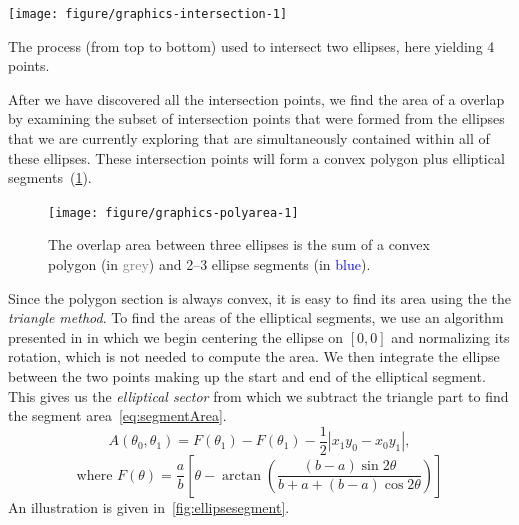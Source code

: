 \documentclass[
  a4paper,
  nofonts,
  nobib,
  titlepage,
  justified,
  marginals=raggedouter,
  nohyper
]{tufte-handout}\usepackage[]{graphicx}\usepackage[]{color}
\newenvironment{knitrout}{}{} %
\begin{document}
\begin{marginfigure}%
\begin{knitrout}
\color{fgcolor}

{\centering \texttt{[image: figure/graphics-intersection-1]} 

}



\end{knitrout}
\caption{The process (from top to bottom) used to intersect two ellipses, here yielding 4 points.}
\label{fig:intersection}
\end{marginfigure}

After we have discovered all the intersection points,
we find the area of a overlap by examining the subset of
intersection points that were formed from the ellipses that we are currently
exploring that are simultaneously contained within all of these ellipses. These
intersection points will form a convex polygon plus elliptical
segments~(\cref{fig:polyarea}).

\begin{figure}[hbtp!]
\begin{knitrout}
\color{fgcolor}

{\centering \texttt{[image: figure/graphics-polyarea-1]} 

}



\end{knitrout}
\label{fig:polyarea}
\caption{The overlap area between three ellipses is the sum of a convex polygon (in \textcolor{grey}{grey}) and 2--3 ellipse segments (in \textcolor{blue}{blue}).}
\end{figure}

Since the polygon section is always convex, it is easy to find its area using
the the \emph{triangle method}. To find the areas of the elliptical segments,
we use an algorithm presented in \citet{eberly_area_2016} in which we begin
centering the ellipse on $[0, 0]$ and normalizing its rotation, which is not
needed to compute the area. We then integrate the ellipse between the two points
making up the start and end of
the elliptical segment. This gives us the \emph{elliptical sector} from which we
subtract the triangle part to find the segment area~\eqref{eq:segmentArea}.
\begin{equation*}
A(\theta_0, \theta_1) = F(\theta_1) - F(\theta_1) -
\frac{1}{2}|x_1y_0 - x_0y_1|,
\label{eq:segmentArea}
\end{equation*}
\[
\text{where } F(\theta) = \frac{a}{b}\left[ \theta -
\arctan{\left(\frac{(b - a)\sin{2\theta}}{b + a +(b - a )\cos{2\theta}} \right)}
\right]
\]
An illustration is given in~\cref{fig:ellipsesegment}.
\end{document}

